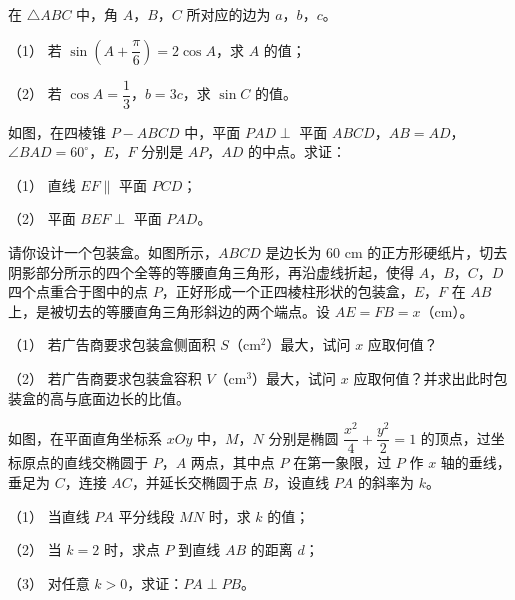 \begin{question}
在 $\triangle ABC$ 中，角 $A$，$B$，$C$ 所对应的边为 $a$，$b$，$c$。

（1） 若 $\sin\left(A+\dfrac\pi6\right)=2\cos A$，求 $A$ 的值；

（2） 若 $\cos A=\dfrac13$，$b=3c$，求 $\sin C$ 的值。

\Needspace{0.4\textheight}
\end{question}
\begin{question}
如图，在四棱锥 $P-ABCD$ 中，平面 $PAD\perp$ 平面 $ABCD$，$AB=AD$，$\angle BAD=60^\circ$，$E$，$F$ 分别是 $AP$，$AD$ 的中点。求证：

（1） 直线 $EF\parallel$ 平面 $PCD$；

（2） 平面 $BEF\perp$ 平面 $PAD$。
\nopagebreak[4]
\begin{center}\end{center}
\nopagebreak[4]
\Needspace{0.4\textheight}
\end{question}
\begin{question}
请你设计一个包装盒。如图所示，$ABCD$ 是边长为 $60$ cm 的正方形硬纸片，切去阴影部分所示的四个全等的等腰直角三角形，再沿虚线折起，使得 $A$，$B$，$C$，$D$ 四个点重合于图中的点 $P$，正好形成一个正四棱柱形状的包装盒，$E$，$F$ 在 $AB$ 上，是被切去的等腰直角三角形斜边的两个端点。设 $AE=FB=x$（cm）。

（1） 若广告商要求包装盒侧面积 $S$（cm$^2$）最大，试问 $x$ 应取何值？

（2） 若广告商要求包装盒容积 $V$（cm$^3$）最大，试问 $x$ 应取何值？并求出此时包装盒的高与底面边长的比值。
\nopagebreak[4]
\begin{center}\end{center}
\nopagebreak[4]
\Needspace{0.4\textheight}
\end{question}
\begin{question}
如图，在平面直角坐标系 $xOy$ 中，$M$，$N$ 分别是椭圆 $\dfrac{x^2}4+\dfrac{y^2}2=1$ 的顶点，过坐标原点的直线交椭圆于 $P$，$A$ 两点，其中点 $P$ 在第一象限，过 $P$ 作 $x$ 轴的垂线，垂足为 $C$，连接 $AC$，并延长交椭圆于点 $B$，设直线 $PA$ 的斜率为 $k$。

（1） 当直线 $PA$ 平分线段 $MN$ 时，求 $k$ 的值；

（2） 当 $k=2$ 时，求点 $P$ 到直线 $AB$ 的距离 $d$；

（3） 对任意 $k>0$，求证：$PA\perp PB$。
\nopagebreak[4]
\begin{center}\end{center}
\nopagebreak[4]
\end{question}
